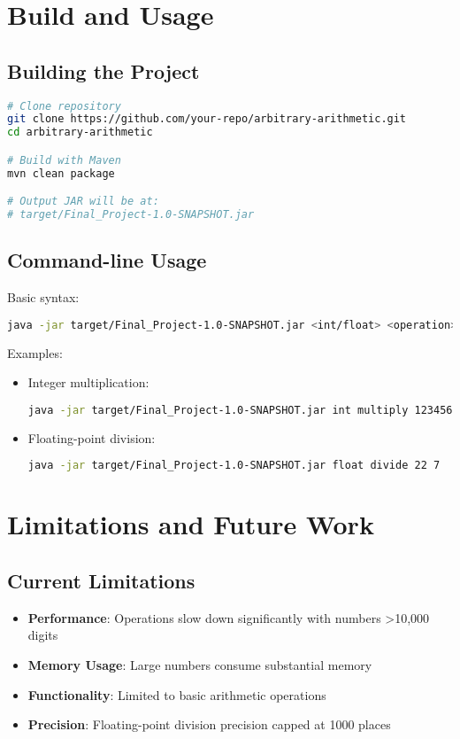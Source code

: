 \documentclass{article}
\begin{document}
\section{Build and Usage}
\subsection{Building the Project}
\begin{lstlisting}[language=bash]
# Clone repository
git clone https://github.com/your-repo/arbitrary-arithmetic.git
cd arbitrary-arithmetic

# Build with Maven
mvn clean package

# Output JAR will be at:
# target/Final_Project-1.0-SNAPSHOT.jar
\end{lstlisting}

\subsection{Command-line Usage}
Basic syntax:
\begin{lstlisting}[language=bash]
java -jar target/Final_Project-1.0-SNAPSHOT.jar <int/float> <operation> <num1> <num2>
\end{lstlisting}

Examples:
\begin{itemize}
    \item Integer multiplication:
    \begin{lstlisting}[language=bash]
java -jar target/Final_Project-1.0-SNAPSHOT.jar int multiply 123456789 987654321
    \end{lstlisting}
    
    \item Floating-point division:
    \begin{lstlisting}[language=bash]
java -jar target/Final_Project-1.0-SNAPSHOT.jar float divide 22 7
    \end{lstlisting}
\end{itemize}

\section{Limitations and Future Work}
\subsection{Current Limitations}
\begin{itemize}
    \item \textbf{Performance}: Operations slow down significantly with numbers >10,000 digits
    \item \textbf{Memory Usage}: Large numbers consume substantial memory
    \item \textbf{Functionality}: Limited to basic arithmetic operations
    \item \textbf{Precision}: Floating-point division precision capped at 1000 places
\end{itemize}
\end{document}
